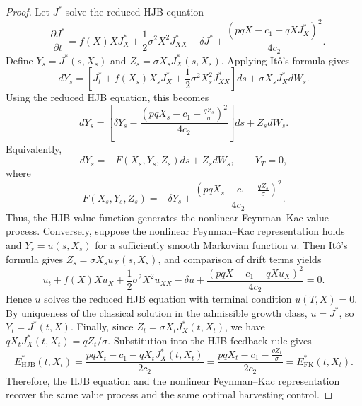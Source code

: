 \documentclass[11pt]{article}
\begin{document}
	\begin{proof}
		Let $J^*$ solve the reduced HJB equation
		\[
		-\frac{\partial J^*}{\partial t}
		=
		f(X)XJ_X^*
		+
		\frac12\sigma^2X^2J_{XX}^*
		-\delta J^*
		+
		\frac{(pqX-c_1-qXJ_X^*)^2}{4c_2}.
		\]
		Define $Y_s=J^*(s,X_s)$ and $Z_s=\sigma X_sJ_X^*(s,X_s)$. Applying It\^o's formula gives
		\[
		dY_s
		=
		\left[
		J_t^*
		+
		f(X_s)X_sJ_X^*
		+
		\frac12\sigma^2X_s^2J_{XX}^*
		\right]ds
		+
		\sigma X_sJ_X^*dW_s.
		\]
		Using the reduced HJB equation, this becomes
		\[
		dY_s
		=
		\left[
		\delta Y_s
		-
		\frac{
			\left(
			pqX_s-c_1-\frac{qZ_s}{\sigma}
			\right)^2
		}{4c_2}
		\right]ds
		+
		Z_sdW_s.
		\]
		Equivalently,
		\[
		dY_s
		=
		-
		F(X_s,Y_s,Z_s)ds
		+
		Z_sdW_s,
		\qquad
		Y_T=0,
		\]
		where
		\[
		F(X_s,Y_s,Z_s)
		=
		-\delta Y_s
		+
		\frac{
			\left(
			pqX_s-c_1-\frac{qZ_s}{\sigma}
			\right)^2
		}{4c_2}.
		\]
		Thus, the HJB value function generates the nonlinear Feynman--Kac value process. Conversely, suppose the nonlinear Feynman--Kac representation holds and $Y_s=u(s,X_s)$ for a sufficiently smooth Markovian function $u$. Then It\^o's formula gives $Z_s=\sigma X_su_X(s,X_s)$, and comparison of drift terms yields
		\[
		u_t
		+
		f(X)Xu_X
		+
		\frac12\sigma^2X^2u_{XX}
		-\delta u
		+
		\frac{(pqX-c_1-qXu_X)^2}{4c_2}
		=
		0.
		\]
		Hence $u$ solves the reduced HJB equation with terminal condition $u(T,X)=0$. By uniqueness of the classical solution in the admissible growth class, $u=J^*$, so $Y_t=J^*(t,X)$. Finally, since $Z_t=\sigma X_tJ_X^*(t,X_t)$, we have $qX_tJ_X^*(t,X_t)=qZ_t/\sigma$. Substitution into the HJB feedback rule gives
		\[
		E^*_{\mathrm{HJB}}(t,X_t)
		=
		\frac{pqX_t-c_1-qX_tJ_X^*(t,X_t)}{2c_2}
		=
		\frac{pqX_t-c_1-\frac{qZ_t}{\sigma}}{2c_2}
		=
		E^*_{\mathrm{FK}}(t,X_t).
		\]
		Therefore, the HJB equation and the nonlinear Feynman--Kac representation recover the same value process and the same optimal harvesting control. 
	\end{proof}
	
\end{document}
